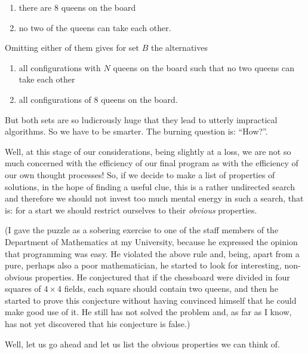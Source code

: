 \begin{enumerate}[wide, nosep, label=(\arabic*)]
	\item there are 8 queens on the board
	\item no two of the queens can take each other.
\end{enumerate}

Omitting either of them gives for set $B$ the alternatives

\begin{enumerate}[leftmargin=*, itemindent=1.9em, label=B\arabic*:]
	\item \label{en:b1-eight-queens}
	all configurations with $N$ queens on the board such that no two queens can take each other
	\item \label{en:b2-eight-queens}
	all configurations of 8 queens on the board.
\end{enumerate}

But both sets are so ludicrously huge that they lead to utterly impractical algorithms. So we have to be smarter. The burning question is: ``How?''.

Well, at this stage of our considerations, being slightly at a loss, we are not so much concerned with the efficiency of our final program as with the efficiency of our own thought processes! So, if we decide to make a list of properties of solutions, in the hope of finding a useful clue, this is a rather undirected search and therefore we should not invest too much mental energy in such a search, that is: for a start we should restrict ourselves to their \textit{obvious} properties.

(I gave the puzzle as a sobering exercise to one of the staff members of the Department of Mathematics at my University, because he expressed the opinion that programming was easy. He violated the above rule and, being, apart from a pure, perhaps also a poor mathematician, he started to look for interesting, non-obvious properties. He conjectured that if the chessboard were divided in four squares of $4\times 4$ fields, each square should contain two queens, and then he started to prove this conjecture without having convinced himself that he could make good use of it. He still has not solved the problem and, as far as I know, has not yet discovered that his conjecture is false.)

Well, let us go ahead and let us list the obvious properties we can think of.

